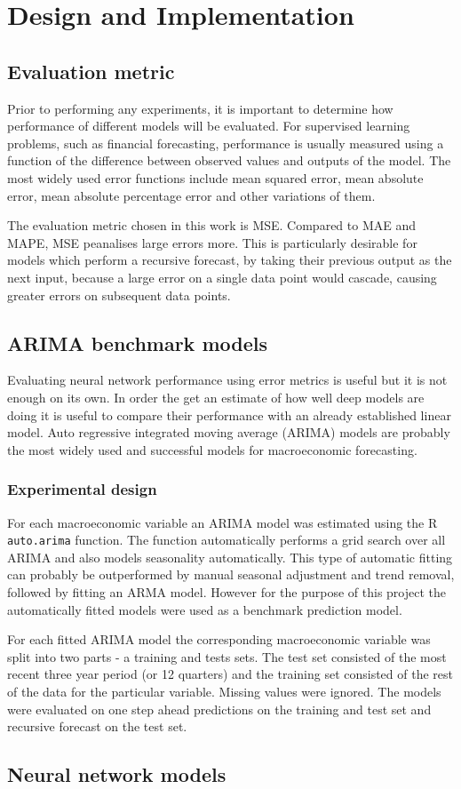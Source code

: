 \chapter{Design and Implementation}

\section{Evaluation metric}
Prior to performing any experiments, it is important to determine how performance of different models will be evaluated. For supervised learning problems, such as financial forecasting, performance is usually measured using a function of the difference between observed values and outputs of the model. The most widely used error functions include mean squared error, mean absolute error, mean absolute percentage error and other variations of them. 

The evaluation metric chosen in this work is MSE. Compared to MAE and MAPE, MSE peanalises large errors more. This is particularly desirable for models which perform a recursive forecast, by taking their previous output as the next input, because a large error on a single data point would cascade, causing greater errors on subsequent data points.

\section{ARIMA benchmark models}
Evaluating neural network performance using error metrics is useful but it is not enough on its own. In order the get an estimate of how well deep models are doing it is useful to compare their performance with an already established linear model. Auto regressive integrated moving average (ARIMA) models are probably the most widely used and successful models for macroeconomic forecasting. 

\subsection{Experimental design}
For each macroeconomic variable an ARIMA model was estimated using the R \lstinline[language=R]{auto.arima} function. The function automatically performs a grid search over all ARIMA and also models seasonality automatically. This type of automatic fitting can probably be outperformed by manual seasonal adjustment and trend removal, followed by fitting an ARMA model. However for the purpose of this project the automatically fitted models were used as a benchmark prediction model.

For each fitted ARIMA model the corresponding macroeconomic variable was split into two parts - a training and tests sets. The test set consisted of the most recent three year period (or 12 quarters) and the training set consisted of the rest of the data for the particular variable. Missing values were ignored. The models were evaluated on one step ahead predictions on the training and test set and recursive forecast on the test set.

\section{Neural network models}
